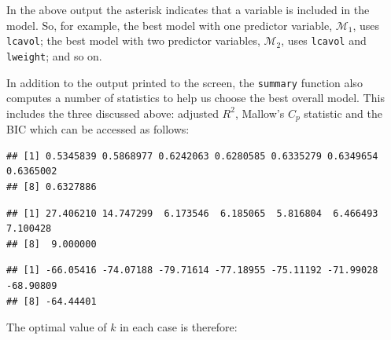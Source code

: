 \documentclass[
]{article}
\newenvironment{Shaded}{\begin{snugshade}}{\end{snugshade}}
\newcommand{\DocumentationTok}[1]{\textcolor[rgb]{0.56,0.35,0.01}{\textbf{\textit{#1}}}}
\newcommand{\NormalTok}[1]{#1}
\newcommand{\SpecialCharTok}[1]{\textcolor[rgb]{0.81,0.36,0.00}{\textbf{#1}}}
\begin{document}
In the above output the asterisk indicates that a variable is included
in the model. So, for example, the best model with one predictor
variable, \(\mathcal{M}_1\), uses \texttt{lcavol}; the best model with
two predictor variables, \(\mathcal{M}_2\), uses \texttt{lcavol} and
\texttt{lweight}; and so on.

In addition to the output printed to the screen, the \texttt{summary}
function also computes a number of statistics to help us choose the best
overall model. This includes the three discussed above: adjusted
\(R^2\), Mallow's \(C_p\) statistic and the BIC which can be accessed as
follows:

\begin{Shaded}
\end{Shaded}

\begin{verbatim}
## [1] 0.5345839 0.5868977 0.6242063 0.6280585 0.6335279 0.6349654 0.6365002
## [8] 0.6327886
\end{verbatim}

\begin{Shaded}
\end{Shaded}

\begin{verbatim}
## [1] 27.406210 14.747299  6.173546  6.185065  5.816804  6.466493  7.100428
## [8]  9.000000
\end{verbatim}

\begin{Shaded}
\end{Shaded}

\begin{verbatim}
## [1] -66.05416 -74.07188 -79.71614 -77.18955 -75.11192 -71.99028 -68.90809
## [8] -64.44401
\end{verbatim}

The optimal value of \(k\) in each case is therefore:
\end{document}
